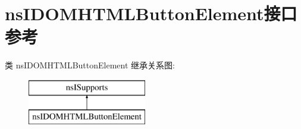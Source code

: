 \hypertarget{interfacens_i_d_o_m_h_t_m_l_button_element}{}\section{ns\+I\+D\+O\+M\+H\+T\+M\+L\+Button\+Element接口 参考}
\label{interfacens_i_d_o_m_h_t_m_l_button_element}
类 ns\+I\+D\+O\+M\+H\+T\+M\+L\+Button\+Element 继承关系图\+:\begin{figure}[H]
\begin{center}
\leavevmode
\includegraphics[height=2.000000cm]{interfacens_i_d_o_m_h_t_m_l_button_element}
\end{center}
\end{figure}
